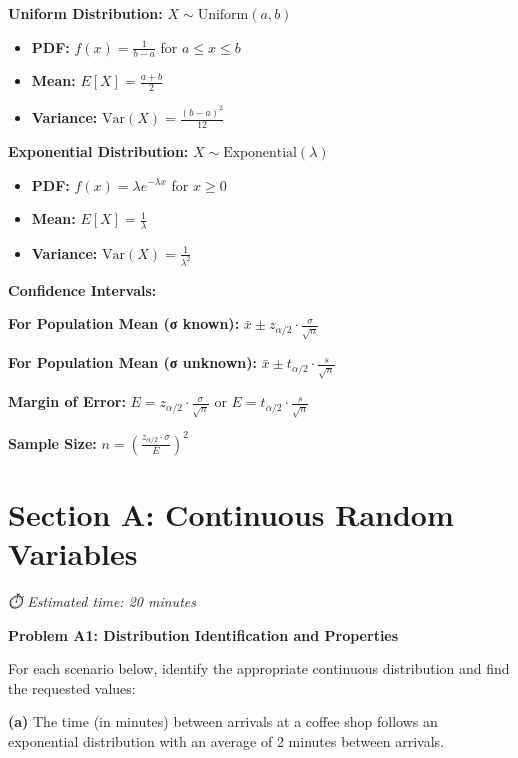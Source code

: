 \documentclass[
  11pt,
]{article}
\providecommand{\tightlist}{%
  \setlength{\itemsep}{0pt}\setlength{\parskip}{0pt}}
\begin{document}
\textbf{Uniform Distribution:} \(X \sim \text{Uniform}(a,b)\)

\begin{itemize}
\tightlist
\item
  \textbf{PDF:} \(f(x) = \frac{1}{b-a}\) for \(a \leq x \leq b\)
\item
  \textbf{Mean:} \(E[X] = \frac{a+b}{2}\)
\item
  \textbf{Variance:} \(\text{Var}(X) = \frac{(b-a)^2}{12}\)
\end{itemize}

\textbf{Exponential Distribution:}
\(X \sim \text{Exponential}(\lambda)\)

\begin{itemize}
\tightlist
\item
  \textbf{PDF:} \(f(x) = \lambda e^{-\lambda x}\) for \(x \geq 0\)
\item
  \textbf{Mean:} \(E[X] = \frac{1}{\lambda}\)
\item
  \textbf{Variance:} \(\text{Var}(X) = \frac{1}{\lambda^2}\)
\end{itemize}

\textbf{Confidence Intervals:}

\textbf{For Population Mean (σ known):}
\(\bar{x} \pm z_{\alpha/2} \cdot \frac{\sigma}{\sqrt{n}}\)

\textbf{For Population Mean (σ unknown):}
\(\bar{x} \pm t_{\alpha/2} \cdot \frac{s}{\sqrt{n}}\)

\textbf{Margin of Error:}
\(E = z_{\alpha/2} \cdot \frac{\sigma}{\sqrt{n}}\) or
\(E = t_{\alpha/2} \cdot \frac{s}{\sqrt{n}}\)

\textbf{Sample Size:}
\(n = \left(\frac{z_{\alpha/2} \cdot \sigma}{E}\right)^2\)

\section{Section A: Continuous Random
Variables}\label{section-a-continuous-random-variables}

\emph{⏱️ Estimated time: 20 minutes}

\textbf{Problem A1: Distribution Identification and Properties}

For each scenario below, identify the appropriate continuous
distribution and find the requested values:

\textbf{(a)} The time (in minutes) between arrivals at a coffee shop
follows an exponential distribution with an average of 2 minutes between
arrivals.
\end{document}
